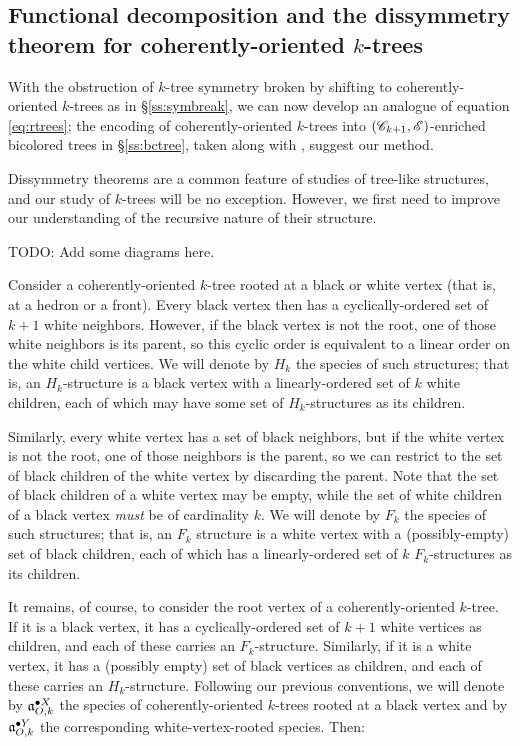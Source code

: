 \documentclass[sectionflow,singlespace,twoside,boldmathhdr]{brandiss} %
\numberwithin{section}{chapter}
\numberwithin{figure}{chapter}
\begin{document}
\subsection{Functional decomposition and the dissymmetry theorem for coherently-oriented $k$-trees}\label{ss:codecomp}
With the obstruction of $k$-tree symmetry broken by shifting to coherently-oriented $k$-trees as in \S \ref{ss:symbreak}, we can now develop an analogue of equation \eqref{eq:rtrees}; the encoding of coherently-oriented $k$-trees into $\pbrac{\specname{C}_{k+1}, \specname{E}}$-enriched bicolored trees in \S \ref{ss:bctree}, taken along with \cite[\S 3.2]{bll:species}, suggest our method.

Dissymmetry theorems are a common feature of studies of tree-like structures, and our study of $k$-trees will be no exception.
However, we first need to improve our understanding of the recursive nature of their structure.

TODO: Add some diagrams here.

Consider a coherently-oriented $k$-tree rooted at a black or white vertex (that is, at a hedron or a front).
Every black vertex then has a cyclically-ordered set of $k+1$ white neighbors.
However, if the black vertex is not the root, one of those white neighbors is its parent, so this cyclic order is equivalent to a linear order on the white child vertices.
We will denote by $H_{k}$ the species of such structures; that is, an $H_{k}$-structure is a black vertex with a linearly-ordered set of $k$ white children, each of which may have some set of $H_{k}$-structures as its children.

Similarly, every white vertex has a set of black neighbors, but if the white vertex is not the root, one of those neighbors is the parent, so we can restrict to the set of black children of the white vertex by discarding the parent.
Note that the set of black children of a white vertex may be empty, while the set of white children of a black vertex \emph{must} be of cardinality $k$.
We will denote by $F_{k}$ the species of such structures; that is, an $F_{k}$ structure is a white vertex with a (possibly-empty) set of black children, each of which has a linearly-ordered set of $k$ $F_{k}$-structures as its children.

It remains, of course, to consider the root vertex of a coherently-oriented $k$-tree. If it is a black vertex, it has a cyclically-ordered set of $k+1$ white vertices as children, and each of these carries an $F_{k}$-structure. Similarly, if it is a white vertex, it has a (possibly empty) set of black vertices as children, and each of these carries an $H_{k}$-structure. Following our previous conventions, we will denote by $\pointed[X]{\mathfrak{a}}_{O, k}$ the species of coherently-oriented $k$-trees rooted at a black vertex and by $\pointed[Y]{\mathfrak{a}}_{O, k}$ the corresponding white-vertex-rooted species. Then:
\end{document}
